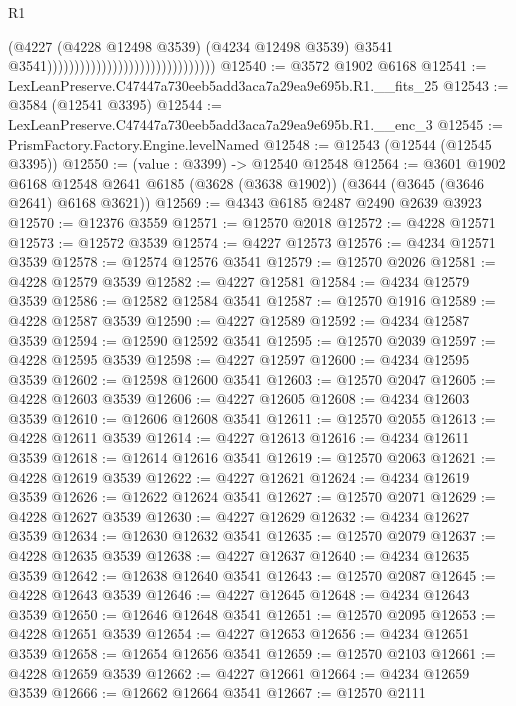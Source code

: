 \begin{lexlean}{R1}
\begin{coremodule}
                                                                (@4227
                                                                  (@4228 @12498 @3539)
                                                                  (@4234 @12498 @3539)
                                                                  @3541
                                                                  @3541)))))))))))))))))))))))))))))))
@12540 := @3572 @1902 @6168
@12541 := LexLeanPreserve.C47447a730eeb5add3aca7a29ea9e695b.R1.__fits_25
@12543 := @3584 (@12541 @3395)
@12544 := LexLeanPreserve.C47447a730eeb5add3aca7a29ea9e695b.R1.__enc_3
@12545 := PrismFactory.Factory.Engine.levelNamed
@12548 := @12543 (@12544 (@12545 @3395))
@12550 := (value : @3399) -> @12540 @12548
@12564 := @3601
    @1902
    @6168
    @12548
    @2641
    @6185
    (@3628 (@3638 @1902))
    (@3644 (@3645 (@3646 @2641) @6168 @3621))
@12569 := @4343 @6185 @2487 @2490 @2639 @3923
@12570 := @12376 @3559
@12571 := @12570 @2018
@12572 := @4228 @12571
@12573 := @12572 @3539
@12574 := @4227 @12573
@12576 := @4234 @12571 @3539
@12578 := @12574 @12576 @3541
@12579 := @12570 @2026
@12581 := @4228 @12579 @3539
@12582 := @4227 @12581
@12584 := @4234 @12579 @3539
@12586 := @12582 @12584 @3541
@12587 := @12570 @1916
@12589 := @4228 @12587 @3539
@12590 := @4227 @12589
@12592 := @4234 @12587 @3539
@12594 := @12590 @12592 @3541
@12595 := @12570 @2039
@12597 := @4228 @12595 @3539
@12598 := @4227 @12597
@12600 := @4234 @12595 @3539
@12602 := @12598 @12600 @3541
@12603 := @12570 @2047
@12605 := @4228 @12603 @3539
@12606 := @4227 @12605
@12608 := @4234 @12603 @3539
@12610 := @12606 @12608 @3541
@12611 := @12570 @2055
@12613 := @4228 @12611 @3539
@12614 := @4227 @12613
@12616 := @4234 @12611 @3539
@12618 := @12614 @12616 @3541
@12619 := @12570 @2063
@12621 := @4228 @12619 @3539
@12622 := @4227 @12621
@12624 := @4234 @12619 @3539
@12626 := @12622 @12624 @3541
@12627 := @12570 @2071
@12629 := @4228 @12627 @3539
@12630 := @4227 @12629
@12632 := @4234 @12627 @3539
@12634 := @12630 @12632 @3541
@12635 := @12570 @2079
@12637 := @4228 @12635 @3539
@12638 := @4227 @12637
@12640 := @4234 @12635 @3539
@12642 := @12638 @12640 @3541
@12643 := @12570 @2087
@12645 := @4228 @12643 @3539
@12646 := @4227 @12645
@12648 := @4234 @12643 @3539
@12650 := @12646 @12648 @3541
@12651 := @12570 @2095
@12653 := @4228 @12651 @3539
@12654 := @4227 @12653
@12656 := @4234 @12651 @3539
@12658 := @12654 @12656 @3541
@12659 := @12570 @2103
@12661 := @4228 @12659 @3539
@12662 := @4227 @12661
@12664 := @4234 @12659 @3539
@12666 := @12662 @12664 @3541
@12667 := @12570 @2111

\end{coremodule}
\end{lexlean}
